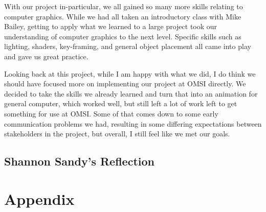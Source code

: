 \documentclass[onecolumn, draftclsnofoot,10pt, compsoc]{IEEEtran}
\begin{document}
With our project in-particular, we all gained so many more skills relating to computer graphics. While we had all taken an introductory class with Mike Bailey, getting to apply what we learned to a large project took our understanding of computer graphics to the next level. Specific skills such as lighting, shaders, key-framing, and general object placement all came into play and gave us great practice. 

Looking back at this project, while I am happy with what we did, I do think we should have focused more on implementing our project at OMSI directly. We decided to take the skills we already learned and turn that into an animation for general computer, which worked well, but still left a lot of work left to get something for use at OMSI. Some of that comes down to some early communication problems we had, resulting in some differing expectations between stakeholders in the project, but overall, I still feel like we met our goals. 

\subsection{Shannon Sandy's Reflection}


\section{Appendix}
\end{document}
